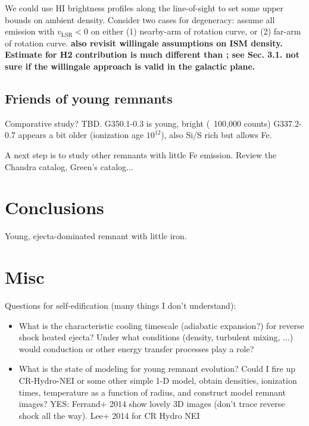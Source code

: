 \documentclass[preprint2,tighten,trackchanges]{aastex6}
\newcommand*{\mt}{\mathrm}
\begin{document}
We could use HI brightness profiles along the line-of-sight to set some upper
bounds on ambient density.
Consider two cases for degeneracy: assume all emission with $v_{\mt{LSR}} < 0$
on either (1) nearby-arm of rotation curve, or (2) far-arm of rotation curve.
\textbf{also revisit willingale assumptions on ISM density.  Estimate for H2
contribution is much different than \citet{yamaguchi2012}; see Sec. 3.1.
not sure if the willingale approach is valid in the galactic plane.}





\subsection{Friends of young remnants}

Comparative study?  TBD.
G350.1-0.3 is young, bright (~100,000 counts)
G337.2-0.7 appears a bit older (ionization age $10^12$), also Si/S rich but
allows Fe.

A next step is to study other remnants with little Fe emission.
Review the Chandra catalog, Green's catalog...


\section{Conclusions}

Young, ejecta-dominated remnant with little iron.

\section{Misc}

Questions for self-edification (many things I don't understand):
\begin{itemize}
    \item What is the characteristic cooling timescale (adiabatic expansion?)
        for reverse shock heated ejecta?
        Under what conditions (density, turbulent mixing, ...)
        would conduction or other energy transfer processes play a role?
    \item What is the state of modeling for young remnant evolution?
        Could I fire up CR-Hydro-NEI or some other simple 1-D model,
        obtain densities, ionization times, temperature as a function of
        radius, and construct model remnant images?
        YES: Ferrand+ 2014 show lovely 3D images (don't trace reverse shock all
        the way).
        Lee+ 2014 for CR Hydro NEI
\end{itemize}
\end{document}
